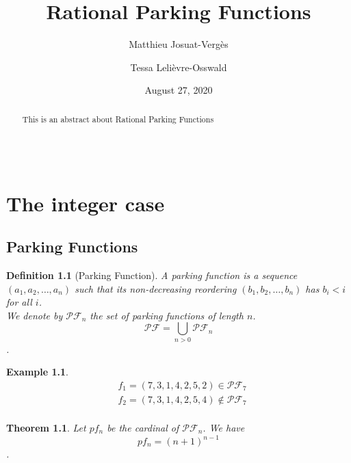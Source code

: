 \documentclass[12pt]{report}
\newtheorem{theorem}{Theorem}
\newtheorem{definition}{Definition}
\newtheorem*{example}{Example}
\begin{document}
\title{Rational Parking Functions}
\author{Matthieu Josuat-Vergès \and Tessa Lelièvre-Osswald}
\date{August 27, 2020}

\maketitle

\begin{abstract}
    This is an abstract about Rational Parking Functions
\end{abstract}

\begin{displaymath}
\end{displaymath}

\chapter{The integer case}

\section{Parking Functions}

\begin{definition}[Parking Function]
    A \emph{parking function} is a sequence $(a_1, a_2, \ldots, a_n)$
    such that its non-decreasing reordering $(b_1, b_2, \ldots, b_n)$
    has $b_i < i$ for all $i$.\\
    We denote by $\mathcal{PF}_n$ the set of parking functions of length $n$.
    $$\mathcal{PF} = \bigcup_{n > 0}{\mathcal{PF}_n}$$.
\end{definition}

\begin{example}
    \begin{align*}
    &f_1 = (7, 3, 1, 4, 2, 5, 2) \in \mathcal{PF}_7\\
    &f_2 = (7, 3, 1, 4, 2, 5, 4) \notin \mathcal{PF}_7\\
    \end{align*}
\end{example}

\begin{theorem}
    Let $pf_n$ be the cardinal of $\mathcal{PF}_n$.
    We have $$pf_n = (n + 1)^{n-1}$$.
\end{theorem}
\end{document}
